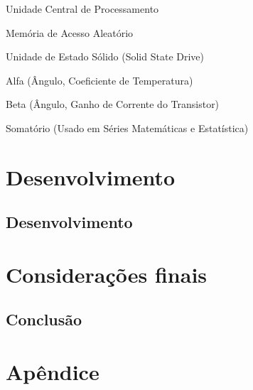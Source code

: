 \documentclass{Arquivos/TrabalhoAcademico}
\begin{document}
\nocite{*}


\pretextual %


\folhaderosto
\contracapa


\listaDeFiguras
\listaDeTabelas


\begin{siglas}
    \item[CPU] Unidade Central de Processamento
    \item[RAM] Memória de Acesso Aleatório
    \item[SSD] Unidade de Estado Sólido (Solid State Drive)
\end{siglas}


\begin{simbolos}
    \item[$\alpha$] Alfa (Ângulo, Coeficiente de Temperatura)
    \item[$\beta$] Beta (Ângulo, Ganho de Corrente do Transistor)
    \item[$\sum$] Somatório (Usado em Séries Matemáticas e Estatística)
\end{simbolos}

\Sumario


\textual %




\chapter{Desenvolvimento}
\section{Desenvolvimento}


\chapter{Considerações finais}
\section{Conclusão}


\postextual %


\printbibliography[heading=none]


\inicioApendices
\chapter{Apêndice}
\end{document}
